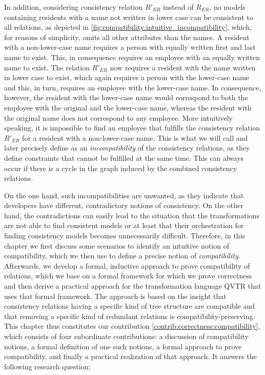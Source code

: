 In addition, considering consistency relation $R'_{ER}$ instead of $R_{ER}$, no models containing residents with a name not written in lower case can be consistent to all relations, as depicted in \autoref{fig:compatibility:intuitive_incompatibility}, which, for reasons of simplicity, omits all other attributes than the names.
A resident with a non-lower-case name requires a person with equally written first and last name to exist.
This, in consequence requires an employee with an equally written name to exist.
The relation $R'_{ER}$ now requires a resident with the name written in lower case to exist, which again requires a person with the lower-case name and this, in turn, requires an employee with the lower-case name.
In consequence, however, the resident with the lower-case name would correspond to both the employee with the original and the lower-case name, whereas the resident with the original name does not correspond to any employee.
More intuitively speaking, it is impossible to find an employee that fulfills the consistency relation $R'_{ER}$ for a resident with a non-lower-case name.
This is what we will call and later precisely define as an \emph{incompatibility} of the consistency relations, as they define constraints that cannot be fulfilled at the same time.
This can always occur if there is a cycle in the graph induced by the combined consistency relations.

On the one hand, such incompatibilities are unwanted, as they indicate that developers have different, contradictory notions of consistency.
On the other hand, the contradictions can easily lead to the situation that the transformations are not able to find consistent models or at least that their orchestration for finding consistency models becomes unnecessarily difficult.
Therefore, in this chapter we first discuss some scenarios to identify an intuitive notion of compatibility, which we then use to define a precise notion of \emph{compatibility}.
Afterwards, we develop a formal, inductive approach to prove compatibility of relations, which we base on a formal framework for which we prove correctness and then derive a practical approach for the transformation language \gls{QVTR} that uses that formal framework.
The approach is based on the insight that consistency relations having a specific kind of tree structure are compatible and that removing a specific kind of redundant relations is compatibility-preserving.
This chapter thus constitutes our contribution \autoref{contrib:correctness:compatibility}, which consists of four subordinate contributions: a discussion of compatibility notions, a formal definition of one such notions, a formal approach to prove compatibility, and finally a practical realization of that approach.
It answers the following research question:

